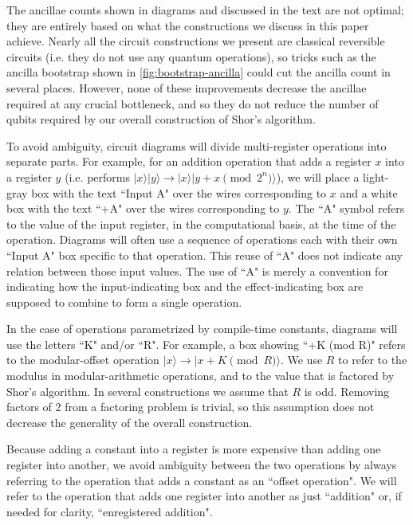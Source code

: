 \documentclass[twocolumn,longbibliography]{quantumarticle-customized}
\begin{document}
The ancillae counts shown in diagrams and discussed in the text are not optimal; they are entirely based on what the constructions we discuss in this paper achieve.
Nearly all the circuit constructions we present are classical reversible circuits (i.e. they do not use any quantum operations), so tricks such as the ancilla bootstrap shown in \autoref{fig:bootstrap-ancilla} could cut the ancilla count in several places.
However, none of these improvements decrease the ancillae required at any crucial bottleneck, and so they do not reduce the number of qubits required by our overall construction of Shor's algorithm.

To avoid ambiguity, circuit diagrams will divide multi-register operations into separate parts.
For example, for an addition operation that adds a register $x$ into a register $y$ (i.e. performs $|x\rangle |y\rangle \rightarrow |x\rangle |y + x \pmod{2^n} \rangle$), we will place a light-gray box with the text ``Input A" over the wires corresponding to $x$ and a white box with the text ``+A" over the wires corresponding to $y$.
The ``A" symbol refers to the value of the input register, in the computational basis, at the time of the operation.
Diagrams will often use a sequence of operations each with their own ``Input A" box specific to that operation.
This reuse of ``A" does not indicate any relation between those input values.
The use of ``A" is merely a convention for indicating how the input-indicating box and the effect-indicating box are supposed to combine to form a single operation.

In the case of operations parametrized by compile-time constants, diagrams will use the letters ``K" and/or ``R".
For example, a box showing ``+K (mod R)" refers to the modular-offset operation $|x\rangle \rightarrow |x+K \pmod{R}\rangle$.
We use $R$ to refer to the modulus in modular-arithmetic operations, and to the value that is factored by Shor's algorithm.
In several constructions we assume that $R$ is odd.
Removing factors of 2 from a factoring problem is trivial, so this assumption does not decrease the generality of the overall construction.

Because adding a constant into a register is more expensive than adding one register into another, we avoid ambiguity between the two operations by always referring to the operation that adds a constant as an ``offset operation".
We will refer to the operation that adds one register into another as just ``addition" or, if needed for clarity, ``enregistered addition".
\end{document}
